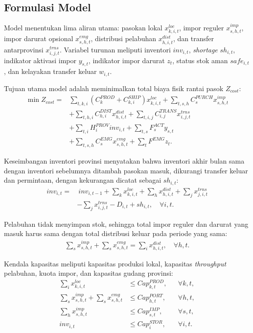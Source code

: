 \documentclass[journal]{IEEEtran}
\theoremstyle{definition}
\theoremstyle{definition}
\theoremstyle{plain}
\begin{document}
    \subsection{Formulasi Model}
    Model menentukan lima aliran utama: pasokan lokal $x^{loc}_{k,i,t}$, impor reguler $x^{imp}_{s,h,t}$, impor darurat opsional $x^{emg}_{s,h,t}$, distribusi pelabuhan $x^{dist}_{h,i,t}$, dan transfer antarprovinsi $x^{trns}_{i,j,t}$. Variabel turunan meliputi inventori $inv_{i,t}$, \textit{shortage} $sh_{i,t}$, indikator aktivasi impor $y_{s,t}$, indikator impor darurat $z_t$, status stok aman $safe_{i,t}$, dan kelayakan transfer keluar $w_{i,t}$.

    Tujuan utama model adalah meminimalkan total biaya fisik rantai pasok $Z_{cost}$:
    \begin{align}
    \min Z_{cost} =
    &\sum_{t,k,i} (C^{PROD}_{k}+C^{SHIP}_{k,i})x^{loc}_{k,i,t}
    + \sum_{t,s,h} C^{PURCH}_{s}x^{imp}_{s,h,t} \nonumber\\
    &+ \sum_{t,h,i} C^{DIST}_{h,i}x^{dist}_{h,i,t}
    + \sum_{t,i,j} C^{TRANS}_{i,j}x^{trns}_{i,j,t} \nonumber\\
    &+ \sum_{t,i} H^{PROV}_{i}inv_{i,t}
    + \sum_{t,s}F^{ACT}_{s}y_{s,t} \nonumber\\
    &+ \sum_{t,s,h} C^{EMG}_{s}x^{emg}_{s,h,t}
    + \sum_t F^{EMG}z_t .
    \label{eq:objective}
    \end{align}

    Keseimbangan inventori provinsi menyatakan bahwa inventori akhir bulan sama dengan inventori sebelumnya ditambah pasokan masuk, dikurangi transfer keluar dan permintaan, dengan kekurangan dicatat sebagai $sh_{i,t}$:
    \begin{align}
    inv_{i,t} =&\ inv_{i,t-1}+\sum_k x^{loc}_{k,i,t}
    +\sum_h x^{dist}_{h,i,t}+\sum_j x^{trns}_{j,i,t} \nonumber\\
    &-\sum_j x^{trns}_{i,j,t}-D_{i,t}+sh_{i,t}, \quad \forall i,t.
    \label{eq:balance}
    \end{align}

    Pelabuhan tidak menyimpan stok, sehingga total impor reguler dan darurat yang masuk harus sama dengan total distribusi keluar pada periode yang sama:
    \begin{align}
    \sum_s x^{imp}_{s,h,t}+\sum_s x^{emg}_{s,h,t}
    =\sum_i x^{dist}_{h,i,t}, \quad \forall h,t.
    \label{eq:port}
    \end{align}

    Kendala kapasitas meliputi kapasitas produksi lokal, kapasitas \textit{throughput} pelabuhan, kuota impor, dan kapasitas gudang provinsi:
    \begin{align}
    \sum_i x^{loc}_{k,i,t} &\leq Cap^{PROD}_{k,t}, &&\forall k,t, \\
    \sum_s x^{imp}_{s,h,t}+\sum_s x^{emg}_{s,h,t} &\leq Cap^{PORT}_{h,t}, &&\forall h,t, \\
    \sum_h x^{imp}_{s,h,t} &\leq Cap^{IMP}_{s,t}, &&\forall s,t, \\
    inv_{i,t} &\leq Cap^{STOR}_{i}, &&\forall i,t.
    \end{align}
\end{document}
